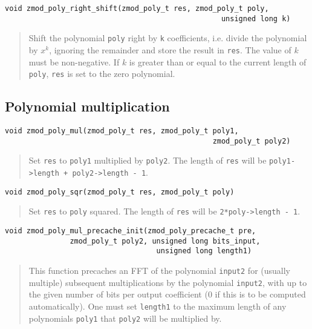 \documentclass[a4paper,10pt]{article}
\newcommand{\code}{\lstinline}
\begin{document}
\begin{lstlisting}
void zmod_poly_right_shift(zmod_poly_t res, zmod_poly_t poly, 
                                                  unsigned long k)
\end{lstlisting}
\begin{quote}
Shift the polynomial \code{poly} right by \code{k} coefficients, i.e. divide the polynomial by $x^k$, ignoring the remainder and store the result in \code{res}. The value of $k$ must be non-negative. If $k$ is greater than or equal to the current length of \code{poly}, \code{res} is set to the zero polynomial.
\end{quote}

\subsection{Polynomial multiplication}
\begin{lstlisting}
void zmod_poly_mul(zmod_poly_t res, zmod_poly_t poly1, 
                                                zmod_poly_t poly2)
\end{lstlisting}
\begin{quote}
Set \code{res} to \code{poly1} multiplied by \code{poly2}. The length of \code{res} will be \code{poly1->length + poly2->length - 1}.
\end{quote}

\begin{lstlisting}
void zmod_poly_sqr(zmod_poly_t res, zmod_poly_t poly)
\end{lstlisting}
\begin{quote}
Set \code{res} to \code{poly} squared. The length of \code{res} will be \code{2*poly->length - 1}.

\end{quote}

\begin{lstlisting}
void zmod_poly_mul_precache_init(zmod_poly_precache_t pre,
               zmod_poly_t poly2, unsigned long bits_input,
                                   unsigned long length1)
\end{lstlisting}
\begin{quote}
This function precaches an FFT of the polynomial \code{input2} for (usually multiple) subsequent multiplications by the polynomial \code{input2}, with up to the given number of bits per output coefficient (0 if this is to be computed automatically). One must set \code{length1} to the maximum length of any polynomials \code{poly1} that \code{poly2} will be multiplied by.  
\end{quote}
\end{document}
